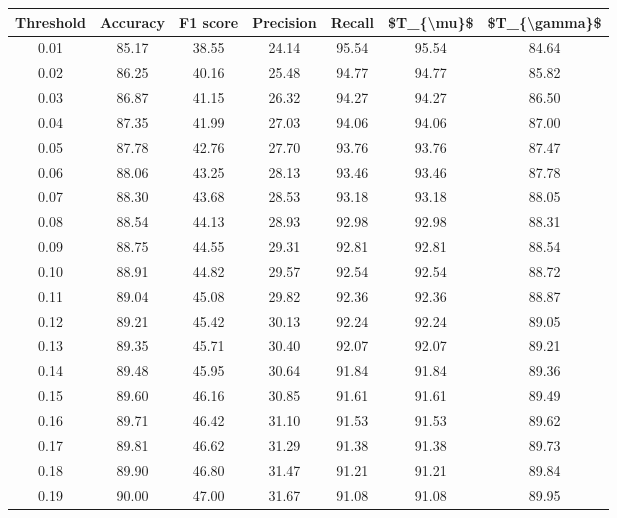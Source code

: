 \begin{tabular}{|c|c|c|c|c|c|c|}
\hline
 Threshold &  Accuracy &  F1 score &  Precision &  Recall &  \$T\_\{\textbackslash mu\}\$ &  \$T\_\{\textbackslash gamma\}\$ \\
\hline
      0.01 &     85.17 &     38.55 &      24.14 &   95.54 &      95.54 &         84.64 \\
      0.02 &     86.25 &     40.16 &      25.48 &   94.77 &      94.77 &         85.82 \\
      0.03 &     86.87 &     41.15 &      26.32 &   94.27 &      94.27 &         86.50 \\
      0.04 &     87.35 &     41.99 &      27.03 &   94.06 &      94.06 &         87.00 \\
      0.05 &     87.78 &     42.76 &      27.70 &   93.76 &      93.76 &         87.47 \\
      0.06 &     88.06 &     43.25 &      28.13 &   93.46 &      93.46 &         87.78 \\
      0.07 &     88.30 &     43.68 &      28.53 &   93.18 &      93.18 &         88.05 \\
      0.08 &     88.54 &     44.13 &      28.93 &   92.98 &      92.98 &         88.31 \\
      0.09 &     88.75 &     44.55 &      29.31 &   92.81 &      92.81 &         88.54 \\
      0.10 &     88.91 &     44.82 &      29.57 &   92.54 &      92.54 &         88.72 \\
      0.11 &     89.04 &     45.08 &      29.82 &   92.36 &      92.36 &         88.87 \\
      0.12 &     89.21 &     45.42 &      30.13 &   92.24 &      92.24 &         89.05 \\
      0.13 &     89.35 &     45.71 &      30.40 &   92.07 &      92.07 &         89.21 \\
      0.14 &     89.48 &     45.95 &      30.64 &   91.84 &      91.84 &         89.36 \\
      0.15 &     89.60 &     46.16 &      30.85 &   91.61 &      91.61 &         89.49 \\
      0.16 &     89.71 &     46.42 &      31.10 &   91.53 &      91.53 &         89.62 \\
      0.17 &     89.81 &     46.62 &      31.29 &   91.38 &      91.38 &         89.73 \\
      0.18 &     89.90 &     46.80 &      31.47 &   91.21 &      91.21 &         89.84 \\
      0.19 &     90.00 &     47.00 &      31.67 &   91.08 &      91.08 &         89.95 \\

\end{tabular}
